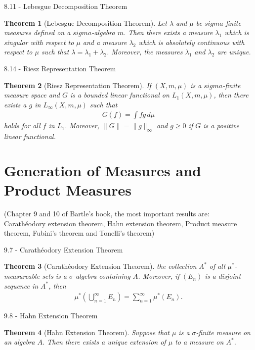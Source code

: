\documentclass{article}
\newtheorem{theorem}{Theorem}[section]
\numberwithin{equation}{section}
\begin{document}
8.11 - Lebesgue Decomposition Theorem

\begin{theorem}[Lebesgue Decomposition Theorem]
    Let $\lambda$ and $\mu$ be $sigma$-finite measures defined on a $sigma$-algebra $m$.
    Then there exists a measure $\lambda_1$ which is singular with respect to $\mu$ and a measure $\lambda_2$ which is absolutely continuous with respect to $\mu$ such that $\lambda = \lambda_1 + \lambda_2$.
    Moreover, the measures $\lambda_1$ and $\lambda_2$ are unique.
\end{theorem}

8.14 - Riesz Representation Theorem

\begin{theorem}[Riesz Representation Theorem]
    If $(X, m, \mu)$ is a $sigma$-finite measure space and $G$ is a bounded linear functional on $L_1(X, m, \mu)$, then there exists a $g$ in $L_\infty(X, m, \mu)$ such that
    \begin{align}\label{eq:b8.10}
        G(f) = \int fg \, d\mu
    \end{align}
    holds for all $f$ in $L_1$.
    Moreover, $\|G\| = \|g\|_\infty$ and $g \geq 0$ if $G$ is a positive linear functional. 
\end{theorem}

\newpage

\section{Generation of Measures and Product Measures}

(Chapter 9 and 10 of Bartle's book, the most important results are: Carathéodory extension theorem, Hahn extension theorem, Product measure theorem, Fubini's theorem and Tonelli's theorem)

9.7 - Carathéodory Extension Theorem

\begin{theorem}[Carathéodory Extension Theorem]
    the collection $A^*$ of all $\mu^*$-measureable sets is a $\sigma$-algebra containing $A$.
    Moreover, if $(E_n)$ is a disjoint sequence in $A^*$, then
    \begin{align}\label{eq:b9.7}
        \mu^*\left(\bigcup_{n = 1}^\infty E_n \right)
        = \sum_{n = 1}^\infty \mu^*(E_n).
    \end{align}
\end{theorem}

9.8 - Hahn Extension Theorem

\begin{theorem}[Hahn Extension Theorem]
    Suppose that $\mu$ is a $\sigma$-finite measure on an algebra $A$.
    Then there exists a unique extension of $\mu$ to a measure on $A^*$.
\end{theorem}
\end{document}
